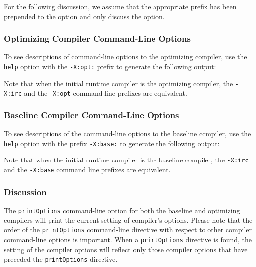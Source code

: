For the following discussion, we assume that the appropriate prefix has been
prepended to the option and only discuss the option.

\subsubsection{Optimizing Compiler Command-Line Options}
\label{section:nonadaptive:optimizing:options}

To see descriptions of command-line options to the optimizing compiler,
use the {\tt help} option with the {\tt -X:opt:} prefix 
to generate the following output:

\T \begin{tiny}

\T \end{tiny}

Note that when the initial runtime compiler is the optimizing compiler, 
the {\tt -X:irc} and the {\tt -X:opt} command line prefixes are equivalent.

\subsubsection{Baseline Compiler Command-Line Options}
\label{section:nonadaptive:baseline:options}

To see descriptions of the command-line options to the baseline
compiler, use the {\tt help} option with the prefix {\tt -X:base:} 
to generate the following output:

\T \begin{small}

\T \end{small}
 
Note that when the initial runtime compiler is the baseline compiler, 
the {\tt -X:irc} and the {\tt -X:base} command line prefixes are equivalent.

\subsubsection{Discussion}

The {\tt printOptions} command-line option for both the baseline and 
optimizing compilers will print the current setting of compiler's options.  
Please note that the order of the {\tt printOptions} command-line directive 
with respect to other compiler command-line options is important.  
When a {\tt printOptions} directive is found, the setting of the  
compiler options will reflect only those compiler options
that have preceded the {\tt printOptions} directive.  

